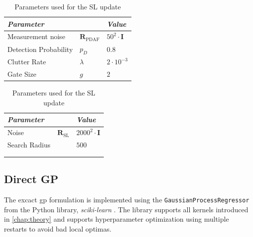 \begin{table}[h]
    \centering
    \begin{subtable}{0.49\textwidth}
        \begin{tabular}{|lll|}
            \textit{\textbf{Parameter}} &                                & \textit{\textbf{Value}}     \\ \hline
            Measurement noise           & $\boldsymbol{R}_{\text{PDAF}}$ & $50^2 \cdot \boldsymbol{I}$ \\
            Detection Probability       & $p_D$                          & $0.8$                       \\
            Clutter Rate                & $\lambda$                      & $2 \cdot 10^{-3}$           \\
            Gate Size                   & $g$                            & $2$
        \end{tabular}
        \caption{Parameters used for \acrshort{pdaf} update}
        \label{table:stats_pdaf_params}
    \end{subtable}
    \begin{subtable}{0.49 \textwidth}

        \centering
        \begin{tabular}{|lll|}
            \textit{\textbf{Parameter}} &                              & \textit{\textbf{Value}}       \\ \hline
            Noise                       & $\boldsymbol{R}_{\text{SL}}$ & $2000^2 \cdot \boldsymbol{I}$ \\
            Search Radius               &                              & $500$                         \\
                                        &                              &                               \\
                                        &                              &
        \end{tabular}
        \caption{Parameters used for the SL update}
        \label{table:stats_sl_params}
    \end{subtable}
\end{table}

\subsection{Direct GP}
The excact \acrshort{gp} formulation is implemented using the \texttt{GaussianProcessRegressor} from the Python library, \textit{sciki-learn} \cite{scikit-learn}. The library supports all kernels introduced in \cref{chap:theory} and supports hyperparameter optimization using multiple restarts to avoid bad local optimas.

